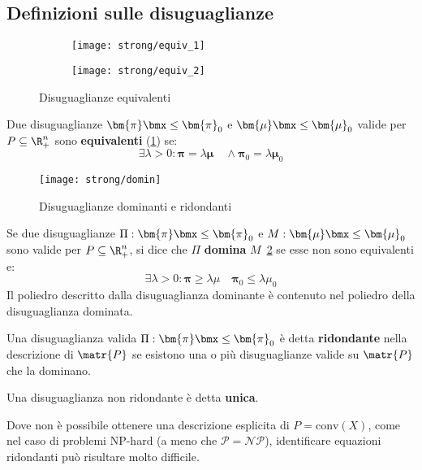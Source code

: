 \documentclass[\main/main.tex]{subfiles}
\begin{document}
\subsection{Definizioni sulle disuguaglianze}
\begin{figure}
    \begin{subfigure}{0.49\textwidth}
        \texttt{[image: strong/equiv\_1]}
    \end{subfigure}
    \begin{subfigure}{0.49\textwidth}
        \texttt{[image: strong/equiv\_2]}
    \end{subfigure}
    \caption{Disuguaglianze equivalenti}\label{ineqequivalent}
\end{figure}
\begin{definition}
    Due disuguaglianze \(\bm{\pi}\bmx \leq \bm{\pi}_{0}\) e \(\bm{\mu}\bmx \leq \bm{\mu}_{0}\) valide per \(P\subseteq\R^n_+\) sono \textbf{equivalenti} (\ref{ineqequivalent}) se:
    \[
        \exists \lambda>0: \bm{\pi} = \lambda\bm{\mu} \quad \land \bm{\pi}_{0} = \lambda\bm{\mu}_{0}
    \]\end{definition}
\begin{figure}
    \texttt{[image: strong/domin]}
    \caption{Disuguaglianze dominanti e ridondanti}\label{ineqdomin}
\end{figure}
\begin{definition}
    Se due disuguaglianze \(\Pi: \bm{\pi}\bmx \leq \bm{\pi}_{0}\) e \(M:\bm{\mu}\bmx \leq \bm{\mu}_{0}\) sono valide per \(P\subseteq\R^n_+\), si dice che \(\Pi \) \textbf{domina} \(M\)~\ref{ineqdomin} se esse non sono equivalenti e:
    \[
        \exists \lambda>0: \bm{\pi} \geq \lambda\mu \quad \bm{\pi}_0 \leq \lambda\mu_0
    \]    Il poliedro descritto dalla disuguaglianza dominante è contenuto nel poliedro della disuguaglianza dominata.
\end{definition}
\begin{definition}
    Una disuguaglianza valida \(\Pi: \bm{\pi}\bmx \leq \bm{\pi}_{0}\) è detta \textbf{ridondante} nella descrizione di \(\matr{P}\) se esistono una o più disuguaglianze valide su \(\matr{P}\) che la dominano.

    Una disuguaglianza non ridondante è detta \textbf{unica}.
\end{definition}

Dove non è possibile ottenere una descrizione esplicita di \(P = \text{conv}(X)\), come nel caso di problemi NP-hard (a meno che \(\mathcal{P}=\mathcal{NP}\)), identificare equazioni ridondanti può risultare molto difficile.
\end{document}
